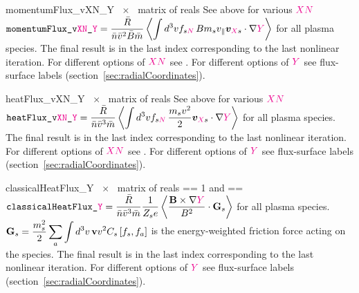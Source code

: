 {momentumFlux_vXN_Y}
{~$\times$~ matrix of reals}
{See above for various $\textcolor{magenta}{XN}$}
{$\displaystyle \text{\ttfamily momentumFlux\_v\textcolor{magenta}{XN}\_\textcolor{magenta}{Y}} = \frac{\bar{R}}{\bar{n} \bar{v}^2 \bar{B} \bar{m}} \left\langle \int d^3v f_{s\textcolor{magenta}{N}} \, B m_s v_{\|} \bm{v}_{\textcolor{magenta}{X}s} \cdot \nabla \textcolor{magenta}{Y}\right\rangle$ for all plasma species. The final result is in the last index corresponding to the last nonlinear iteration.\newline
For different options of $\textcolor{magenta}{XN}$ see  
.\newline
For different options of $\textcolor{magenta}{Y}$ see flux-surface labels (section~\ref{sec:radialCoordinates}).}

\myhrule

{heatFlux_vXN_Y}
{~$\times$~ matrix of reals}
{See above for various $\textcolor{magenta}{XN}$}
{$\displaystyle \text{\ttfamily heatFlux\_v\textcolor{magenta}{XN}\_\textcolor{magenta}{Y}} = \frac{\bar{R}}{\bar{n} \bar{v}^3 \bar{m}} \left\langle \int d^3v f_{s\textcolor{magenta}{N}} \, \frac{m_s v^2}{2} \bm{v}_{\textcolor{magenta}{X}s} \cdot \nabla \textcolor{magenta}{Y}\right\rangle$ for all plasma species. The final result is in the last index corresponding to the last nonlinear iteration.\newline
For different options of $\textcolor{magenta}{XN}$ see  
.\newline
For different options of $\textcolor{magenta}{Y}$ see flux-surface labels (section~\ref{sec:radialCoordinates}).}

\myhrule

{classicalHeatFlux_Y}
{~$\times$~ matrix of reals}
{ == 1 and  == \true}
{$\displaystyle \text{\ttfamily classicalHeatFlux\_\textcolor{magenta}{Y}} = \frac{\bar{R}}{\bar{n} \bar{v}^3 \bar{m}} \frac{1}{Z_s e} \left\langle \frac{{\mathbf B} \times \nabla \textcolor{magenta}{Y}}{B^2} \cdot {\mathbf G}_s \right\rangle$ for all plasma species. $\displaystyle {\mathbf G}_s = \frac{m_s^2}{2}\sum_a \int d^3v \, {\mathbf v} v^2 C_s \left[f_s, f_a\right]$ is the energy-weighted friction force acting on the species. The final result is in the last index corresponding to the last nonlinear iteration.\newline
For different options of $\textcolor{magenta}{Y}$ see flux-surface labels (section~\ref{sec:radialCoordinates}).}


